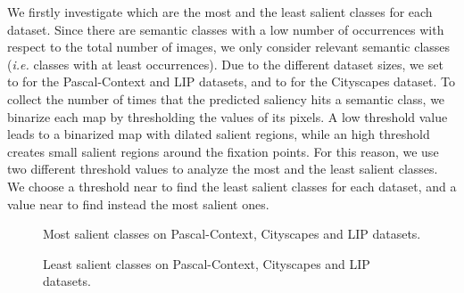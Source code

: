 We firstly investigate which are the most and the least salient classes for each dataset. Since there are semantic classes with a low number of occurrences with respect to the total number of images, we only consider relevant semantic classes (\textit{i.e.} classes with at least  occurrences). Due to the different dataset sizes, we set  to  for the Pascal-Context and LIP datasets, and to  for the Cityscapes dataset. To collect the number of times that the predicted saliency hits a semantic class, we binarize each map by thresholding the values of its pixels. A low threshold value leads to a binarized map with dilated salient regions, while an high threshold creates small salient regions around the fixation points. For this reason, we use two different threshold values to analyze the most and the least salient classes. We choose a threshold near  to find the least salient classes for each dataset, and a value near  to find instead the most salient ones.

\begin{figure}[tb]
\centering
{}
\caption{Most salient classes on Pascal-Context, Cityscapes and LIP datasets.}
\label{fig:most}
\end{figure}

\begin{figure}[tb]
\centering
{}
\caption{Least salient classes on Pascal-Context, Cityscapes and LIP datasets.}
\label{fig:less}
\end{figure}


